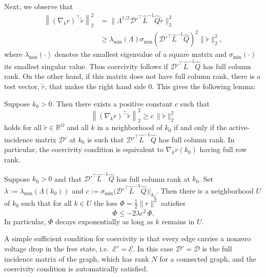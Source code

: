 \documentclass{siamart}
\begin{document}
Next, we observe that 
\begin{equation}
\begin{aligned}
    \left\|(\nabla_k r)^\top \tilde{r}\right\|_2^2 &= \|\Lambda^{1/2} \mathscr{D}'^\top \hat{L}^{-1}\hat{Q}\tilde{r}\|_2^2
    \\ 
    &\ge \lambda_{\min}\left(\Lambda\right)\sigma_{\min}\left(\mathscr{D}'^\top \hat{L}^{-1}\hat{Q}\right)^2\|\tilde{r}\|_2^2,
    \end{aligned}
\end{equation}
where $\lambda_{\min} (\cdot)$ denotes the smallest eigenvalue of a square matrix and $\sigma_{\min} (\cdot)$ its smallest singular value. 
Thus coercivity follows if $\mathscr{D}'^\top\hat{L}^{-1}\hat{Q}$ has full column rank. On the other hand, if this matrix does not have full column rank, there is a test vector, $\tilde{r}$, that makes the right hand side $0$. This gives the following lemma:
\begin{lemma}
\label{lem:coercivity_iff}
    Suppose $k_0>0$. Then there exists a positive constant $c$ such that
    \[ \left\|(\nabla_k r)^\top \tilde{r}\right\|_2^2\ge c\,\|\tilde{r}\|_2^2\]
    holds for all $\tilde{r} \in \mathbb{R}^O$ and all $k$ in a neighborhood of $k_0$ if and only if the active-incidence matrix $\mathscr{D}'$ at $k_0$ is such that $\mathscr{D}'^\top\hat{L}^{-1}\hat{Q}$ has full column rank. In particular, the coercivity condition is equivalent to $\nabla_k r(k_0)$ having full row rank.
\end{lemma}

\begin{theorem}[Coercivity of EP]
\label{thm:EP_coercivity}
    Suppose $k_0>0$ and that $\mathscr{D}'^\top\hat{L}^{-1}\hat{Q}$ has full column rank at $k_0$. Set $\lambda := \lambda_{\min}(\Lambda(k_0))$ and $c := \sigma_{\min}\bigl(\mathscr{D}'^\top\hat{L}^{-1}\hat{Q}\bigr)\big|_{k_0}$. Then there is a neighborhood $U$ of $k_0$ such that for all $k \in U$ the loss $\Phi = \frac{1}{2}\|r\|^2$ satisfies
\begin{equation}
    \dot{\Phi} \leq -2\lambda c^2\,\Phi.
\end{equation}
In particular, $\Phi$ decays exponentially as long as $k$ remains in $U$.
\end{theorem}

\begin{remark}
A simple sufficient condition for coercivity is that every edge carries a nonzero voltage drop in the free state, i.e.\ $\mathcal{E}' = \mathcal{E}$. In this case $\mathscr{D}' = \mathscr{D}$ is the full incidence matrix of the graph, which has rank $N$ for a connected graph, and the coercivity condition is automatically satisfied.
\end{remark}
\end{document}
